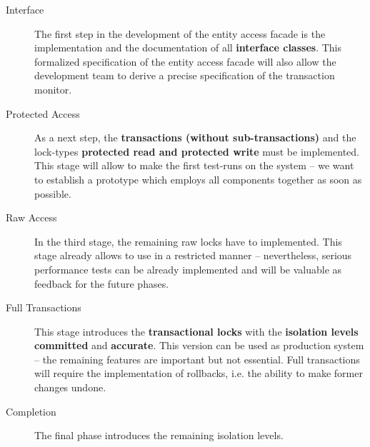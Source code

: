 \documentclass[a4paper, 10pt]{book}
\begin{document}
                                \begin{description}
                                    \item[Interface] The first step in the development of the entity
                                        access facade is the implementation and the documentation of all
                                        \textbf{interface classes}. This formalized specification of the
                                        entity access facade will also allow the development team to derive
                                        a precise specification of the transaction monitor.
                                    \item[Protected Access] As a next step, the \textbf{transactions
                                        (without sub-transactions)} and the lock-types \textbf{protected
                                        read and protected write} must be implemented. This stage will
                                        allow to make the first test-runs on the system -- we want to
                                        establish a prototype which employs all components together as soon
                                        as possible.
                                    \item[Raw Access] In the third stage, the remaining raw locks have to
                                        implemented. This stage already allows to use \SYNEIGHT in a restricted
                                        manner -- nevertheless, serious performance tests can be already
                                        implemented and will be valuable as feedback for the future phases.
                                    \item[Full Transactions] This stage introduces the
                                        \textbf{transactional locks} with the \textbf{isolation levels
                                        committed} and \textbf{accurate}. This version can be used as
                                        production system -- the remaining features are important but not
                                        essential. Full transactions will require the implementation 
                                        of rollbacks, i.e. the ability to make former changes undone. 
                                    \item[Completion] The final phase introduces the remaining isolation
                                        levels. 
                                \end{description}
\end{document}

